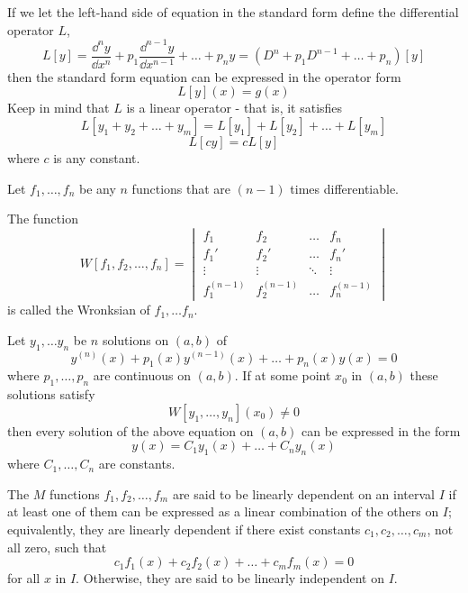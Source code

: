 \documentclass[../diffeq.tex]{subfiles}
\begin{document}
If we let the left-hand side of equation in the standard form define the differential operator $L$,
\[ L[y]=\frac{\dd^n y}{\dd x^n}+p_1\frac{\dd^{n-1}y}{\dd x^{n-1}}+\dots +p_n y = (D^n+p_1D^{n-1}+\dots+p_n)[y] \]
then the standard form equation can be expressed in the operator form 
\[ L[y](x)=g(x) \]
Keep in mind that $L$ is a linear operator - that is, it satisfies 
\[ L[y_1+y_2+\dots+y_m]=L[y_1]+L[y_2]+\dots+L[y_m]\]
\[ L[cy]=cL[y] \]
where $c$ is any constant.

\begin{definition}[Wronksian]
    Let $f_1,\dots,f_n$ be any $n$ functions that are $(n-1)$ times differentiable.
    
    The function \[
        W[f_1, f_2, \dots, f_n] =
        \begin{vmatrix}
        f_1 & f_2 & \dots & f_n \\
        f_1' & f_2' & \dots & f_n' \\
        \vdots & \vdots & \ddots & \vdots \\
        f_1^{(n-1)} & f_2^{(n-1)} & \dots & f_n^{(n-1)}
        \end{vmatrix}
        \]
        is called the Wronksian of $f_1,\dots f_n$.
\end{definition}

\begin{theorem}
    Let $y_1,\dots y_n$ be $n$ solutions on $(a,b)$ of 
    \[ y^{(n)}(x)+p_1(x)y^{(n-1)}(x)+\dots + p_n(x)y(x)=0 \]
    where $p_1,\dots , p_n$ are continuous on $(a,b)$. If at some point $x_0$ in $(a,b)$ these solutions satisfy 
    \[ W[y_1,\dots,y_n](x_0)\neq 0 \]
    then every solution of the above equation on $(a,b)$ can be expressed in the form 
    \[ y(x)=C_1y_1(x)+\dots + C_ny_n(x) \]
    where $C_1,\dots,C_n$ are constants.
\end{theorem}

\begin{definition}
    The $M$ functions $f_1,f_2,\dots,f_m$ are said to be linearly dependent on an interval $I$ if at least one of them can be expressed as a linear combination of the others on $I$; equivalently, they are linearly dependent if there exist constants $c_1,c_2,\dots, c_m$, not all zero, such that 
    \[c_1f_1(x)+c_2f_2(x)+\dots +c_mf_m(x)=0 \]
    for all $x$ in $I$. Otherwise, they are said to be linearly independent on $I$.
\end{definition}
\end{document}
